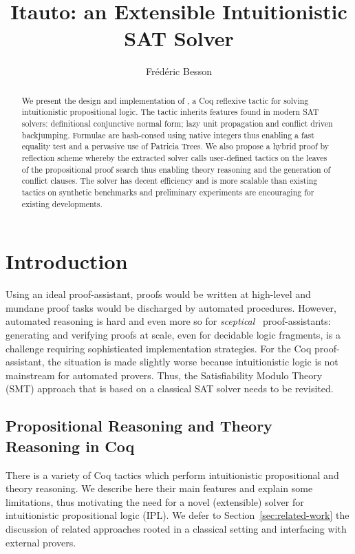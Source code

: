 \documentclass[utf8,a4paper,UKenglish,cleveref, autoref, thm-restate]{lipics-v2019}
\title{Itauto: an Extensible Intuitionistic SAT Solver}
\author{Frédéric Besson}{Inria, Univ Rennes, IRISA}{frederic.besson@inria.fr}{}{}
\begin{document}
\maketitle

\begin{abstract}
  We present the design and implementation of , a Coq
  reflexive tactic for solving intuitionistic propositional logic. The
  tactic inherits features found in modern SAT solvers: definitional
  conjunctive normal form; lazy unit propagation and conflict driven
  backjumping.
  Formulae are hash-consed using native integers thus enabling a
  fast equality test and a pervasive use of Patricia Trees.
  We also propose a hybrid proof by reflection scheme whereby the
  extracted solver calls user-defined tactics on the leaves of the
  propositional proof search thus enabling theory reasoning and the
  generation of conflict clauses.
  The solver has decent efficiency and is more scalable than existing
  tactics on synthetic benchmarks and preliminary experiments are
  encouraging for existing developments.
\end{abstract}


\section{Introduction}
\label{sec:intro}
Using an ideal proof-assistant, proofs would be written at high-level
and mundane proof tasks would be discharged by automated procedures.
%
However, automated reasoning is hard and even more so for
\emph{sceptical}~\cite{HarrisonT98} proof-assistants: generating and
verifying proofs at scale, even for decidable logic fragments, is a
challenge requiring sophisticated implementation strategies.
%
For the Coq proof-assistant, the situation is made slightly worse
because intuitionistic logic is not mainstream for automated provers.
Thus, the Satisfiability Modulo Theory (SMT) approach that is based on a
classical SAT solver needs to be revisited. 

\subsection{Propositional Reasoning and Theory Reasoning in Coq}
\label{sec:prop-in-coq}

There is a variety of Coq tactics which perform intuitionistic
propositional and theory reasoning. We describe here their main
features and explain some limitations, thus motivating the need for a
novel (extensible) solver for intuitionistic propositional logic
(IPL). We defer to Section~\ref{sec:related-work} the discussion of
related approaches rooted in a classical setting and interfacing with
external provers.
\end{document}
